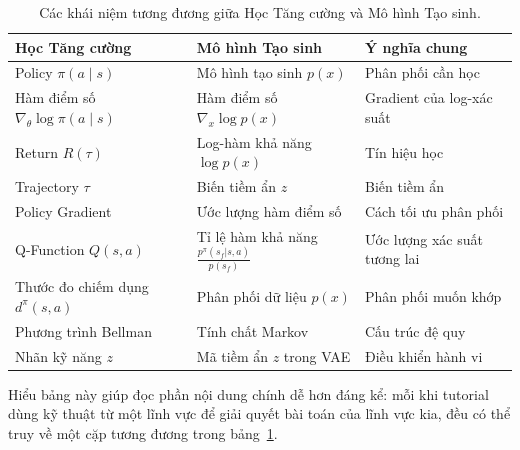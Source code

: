 \begin{table}[H]
    \centering
    \caption{Các khái niệm tương đương giữa Học Tăng cường và Mô hình Tạo sinh.}
    \label{tab:rl_genai}
    \small
    \begin{tabular}{p{} p{} p{}}
        \toprule
        \textbf{Học Tăng cường} & \textbf{Mô hình Tạo sinh} &
        \textbf{Ý nghĩa chung} \\
        \midrule
        Policy $\pi(a \mid s)$ & Mô hình tạo sinh $p(x)$ & Phân phối cần học \\
        Hàm điểm số $\nabla_\theta \log \pi(a \mid s)$ & Hàm điểm số $\nabla_x \log p(x)$ & Gradient của log-xác suất \\
        Return $R(\tau)$ & Log-hàm khả năng $\log p(x)$ & Tín hiệu học \\
        Trajectory $\tau$ & Biến tiềm ẩn $z$ & Biến tiềm ẩn \\
        Policy Gradient & Ước lượng hàm điểm số & Cách tối ưu phân phối \\
        Q-Function $Q(s,a)$ & Tỉ lệ hàm khả năng $\frac{p^\pi(s_f|s,a)}{p(s_f)}$ & Ước lượng xác suất tương lai \\
        Thước đo chiếm dụng $d^\pi(s,a)$ & Phân phối dữ liệu $p(x)$ & Phân phối muốn khớp \\
        Phương trình Bellman & Tính chất Markov & Cấu trúc đệ quy \\
        Nhãn kỹ năng $z$ & Mã tiềm ẩn $z$ trong VAE & Điều khiển hành vi \\
        \bottomrule
    \end{tabular}
    \normalsize
\end{table}
 
Hiểu bảng này giúp đọc phần nội dung chính dễ hơn đáng kể: mỗi khi
tutorial dùng kỹ thuật từ một lĩnh vực để giải quyết bài toán của
lĩnh vực kia, đều có thể truy về một cặp tương đương trong
bảng~\ref{tab:rl_genai}.